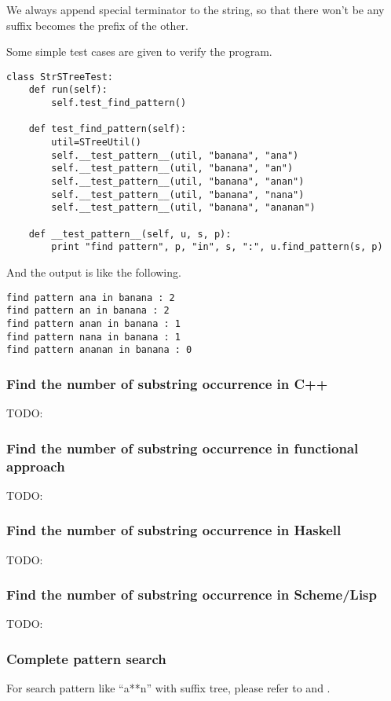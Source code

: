 \documentclass{article}
\begin{document}
We always append special terminator to the string, so that there won't
be any suffix becomes the prefix of the other\cite{wiki-suffix-tree}.

Some simple test cases are given to verify the program.

\begin{lstlisting}
class StrSTreeTest:
    def run(self):
        self.test_find_pattern()

    def test_find_pattern(self):
        util=STreeUtil()
        self.__test_pattern__(util, "banana", "ana")
        self.__test_pattern__(util, "banana", "an")
        self.__test_pattern__(util, "banana", "anan")
        self.__test_pattern__(util, "banana", "nana")
        self.__test_pattern__(util, "banana", "ananan")

    def __test_pattern__(self, u, s, p):
        print "find pattern", p, "in", s, ":", u.find_pattern(s, p)
\end{lstlisting}

And the output is like the following.

\begin{verbatim}
find pattern ana in banana : 2
find pattern an in banana : 2
find pattern anan in banana : 1
find pattern nana in banana : 1
find pattern ananan in banana : 0
\end{verbatim}

\subsubsection*{Find the number of substring occurrence in C++}
TODO:

\subsubsection{Find the number of substring occurrence in functional approach}
TODO:

\subsubsection*{Find the number of substring occurrence in Haskell}
TODO:

\subsubsection*{Find the number of substring occurrence in Scheme/Lisp}
TODO:

\subsubsection{Complete pattern search}
For search pattern like ``a**n'' with suffix tree, please refer to \cite{ukkonen-lec} and \cite{ukkonen-search}.
\end{document}
